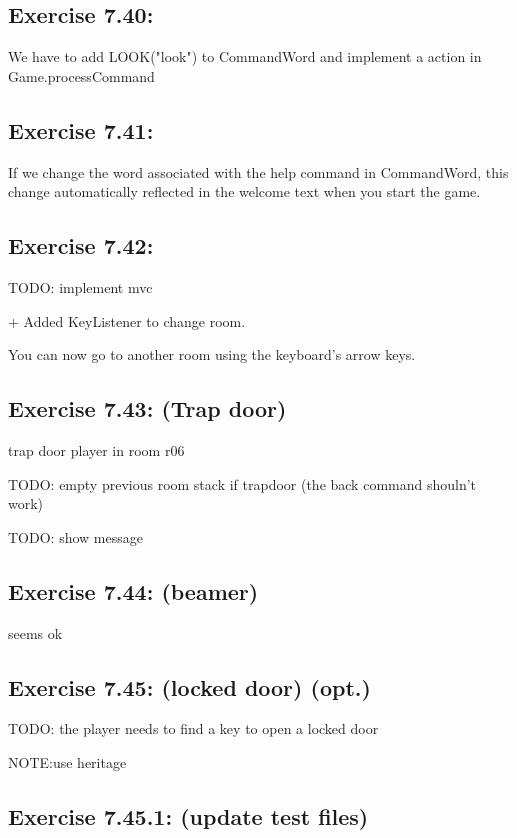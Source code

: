 \documentclass[twoside,french]{report}
\begin{document}
\subsection*{Exercise 7.40:}

We have to add LOOK("look") to CommandWord and implement a action in Game.processCommand

\subsection*{Exercise 7.41:}

If we change the word associated with the help command in CommandWord, this change automatically reflected in the welcome text when you start the game.

\subsection*{Exercise 7.42:}

TODO: implement mvc

+ Added KeyListener to change room.

You can now go to another room using the keyboard's arrow keys.

\subsection*{Exercise 7.43: (Trap door)}

trap door player in room r06

TODO: empty previous room stack if trapdoor (the back command shouln't work)

TODO: show message

\subsection*{Exercise 7.44: (beamer)}

seems ok

\subsection*{Exercise 7.45: (locked door) (opt.)}

TODO: the player needs to find a key to open a locked door

NOTE:use heritage

\subsection*{Exercise 7.45.1: (update test files)}
\end{document}
